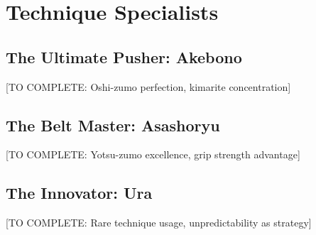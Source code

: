 \section{Technique Specialists}

\subsection{The Ultimate Pusher: Akebono}

[TO COMPLETE: Oshi-zumo perfection, kimarite concentration]

\subsection{The Belt Master: Asashoryu}

[TO COMPLETE: Yotsu-zumo excellence, grip strength advantage]

\subsection{The Innovator: Ura}

[TO COMPLETE: Rare technique usage, unpredictability as strategy]